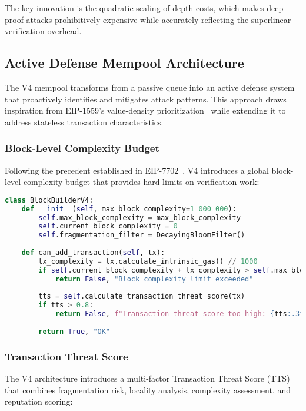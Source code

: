 \documentclass{article}
\begin{document}
The key innovation is the quadratic scaling of depth costs, which makes deep-proof attacks prohibitively expensive while accurately reflecting the superlinear verification overhead.

\subsection{Active Defense Mempool Architecture}

The V4 mempool transforms from a passive queue into an active defense system that proactively identifies and mitigates attack patterns. This approach draws inspiration from EIP-1559's value-density prioritization~\cite{buterin2019eip1559} while extending it to address stateless transaction characteristics.

\subsubsection{Block-Level Complexity Budget}

Following the precedent established in EIP-7702~\cite{buterin2024eip7702}, V4 introduces a global block-level complexity budget that provides hard limits on verification work:

\begin{lstlisting}[language=Python,caption={Block-Level Resource Management},label={lst:blockbudget}]
class BlockBuilderV4:
    def __init__(self, max_block_complexity=1_000_000):
        self.max_block_complexity = max_block_complexity
        self.current_block_complexity = 0
        self.fragmentation_filter = DecayingBloomFilter()
    
    def can_add_transaction(self, tx):
        tx_complexity = tx.calculate_intrinsic_gas() // 1000
        if self.current_block_complexity + tx_complexity > self.max_block_complexity:
            return False, "Block complexity limit exceeded"
        
        tts = self.calculate_transaction_threat_score(tx)
        if tts > 0.8:
            return False, f"Transaction threat score too high: {tts:.3f}"
        
        return True, "OK"
\end{lstlisting}

\subsubsection{Transaction Threat Score}

The V4 architecture introduces a multi-factor Transaction Threat Score (TTS) that combines fragmentation risk, locality analysis, complexity assessment, and reputation scoring:
\end{document}
